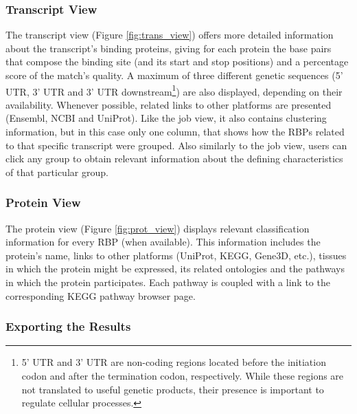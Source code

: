 \subsubsection*{Transcript View}

The transcript view (Figure \ref{fig:trans_view}) offers more detailed
information about the transcript's binding proteins, giving for each protein the
base pairs that compose the binding site (and its start and stop positions) and
a percentage score of the match's quality. A maximum of three different genetic
sequences (5’ UTR, 3’ UTR and 3’ UTR downstream\footnote{5' UTR and 3' UTR are
non-coding regions located before the initiation codon and after the termination
codon, respectively. While these regions are not translated to useful genetic
products, their presence is important to regulate cellular processes.}) are also
displayed, depending on their availability. Whenever possible, related links to
other platforms are presented (Ensembl, NCBI and UniProt). Like the job view, it
also contains clustering information, but in this case only one column, that
shows how the RBPs related to that specific transcript were grouped. Also
similarly to the job view, users can click any group to obtain relevant
information about the defining characteristics of that particular group.

\subsubsection*{Protein View}

The protein view (Figure \ref{fig:prot_view}) displays relevant classification
information for every RBP (when available). This information includes the
protein's name, links to other platforms (UniProt, KEGG, Gene3D, etc.), tissues
in which the protein might be expressed, its related ontologies and the pathways
in which the protein participates. Each pathway is coupled with a link to the
corresponding KEGG pathway browser page.

\subsubsection*{Exporting the Results}

